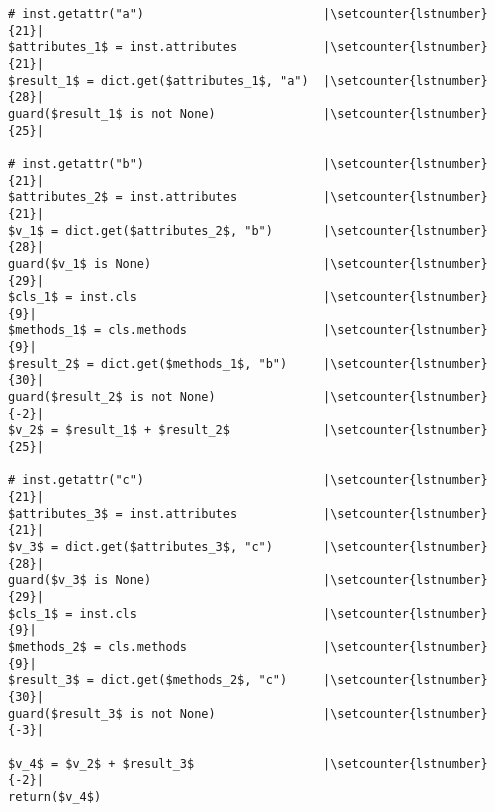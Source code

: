 \begin{lstlisting}[mathescape,xleftmargin=20pt,numberblanklines=false,numbers=right,escapechar=|, firstnumber=27,basicstyle=\ttfamily]
# inst.getattr("a")                         |\setcounter{lstnumber}{21}|
$attributes_1$ = inst.attributes            |\setcounter{lstnumber}{21}|
$result_1$ = dict.get($attributes_1$, "a")  |\setcounter{lstnumber}{28}|
guard($result_1$ is not None)               |\setcounter{lstnumber}{25}|

# inst.getattr("b")                         |\setcounter{lstnumber}{21}|
$attributes_2$ = inst.attributes            |\setcounter{lstnumber}{21}|
$v_1$ = dict.get($attributes_2$, "b")       |\setcounter{lstnumber}{28}|
guard($v_1$ is None)                        |\setcounter{lstnumber}{29}|
$cls_1$ = inst.cls                          |\setcounter{lstnumber}{9}|
$methods_1$ = cls.methods                   |\setcounter{lstnumber}{9}|
$result_2$ = dict.get($methods_1$, "b")     |\setcounter{lstnumber}{30}|
guard($result_2$ is not None)               |\setcounter{lstnumber}{-2}|
$v_2$ = $result_1$ + $result_2$             |\setcounter{lstnumber}{25}|

# inst.getattr("c")                         |\setcounter{lstnumber}{21}|
$attributes_3$ = inst.attributes            |\setcounter{lstnumber}{21}|
$v_3$ = dict.get($attributes_3$, "c")       |\setcounter{lstnumber}{28}|
guard($v_3$ is None)                        |\setcounter{lstnumber}{29}|
$cls_1$ = inst.cls                          |\setcounter{lstnumber}{9}|
$methods_2$ = cls.methods                   |\setcounter{lstnumber}{9}|
$result_3$ = dict.get($methods_2$, "c")     |\setcounter{lstnumber}{30}|
guard($result_3$ is not None)               |\setcounter{lstnumber}{-3}|

$v_4$ = $v_2$ + $result_3$                  |\setcounter{lstnumber}{-2}|
return($v_4$)
\end{lstlisting} %
